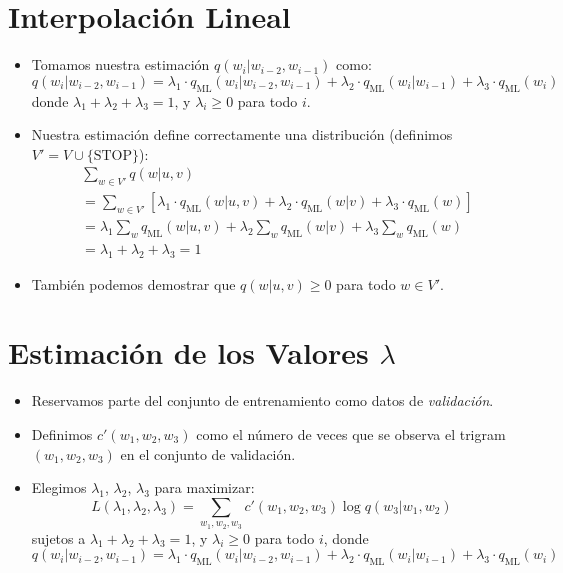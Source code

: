 \section{Interpolación Lineal}
\begin{itemize}
    \item Tomamos nuestra estimación $q(w_i | w_{i-2}, w_{i-1})$ como:
    \[
    q(w_i | w_{i-2}, w_{i-1}) = \lambda_1 \cdot q_{\text{ML}}(w_i | w_{i-2}, w_{i-1}) + \lambda_2 \cdot q_{\text{ML}}(w_i | w_{i-1}) + \lambda_3 \cdot q_{\text{ML}}(w_i)
    \]
    donde $\lambda_1 + \lambda_2 + \lambda_3 = 1$, y $\lambda_i \geq 0$ para todo $i$.    
    \item Nuestra estimación define correctamente una distribución (definimos $V' = V \cup \{\text{STOP}\}$):
    \[
    \begin{aligned}
        & \sum_{w \in V'} q(w | u, v) \\
        &= \sum_{w \in V'} [\lambda_1 \cdot q_{\text{ML}}(w | u, v) + \lambda_2 \cdot q_{\text{ML}}(w | v) + \lambda_3 \cdot q_{\text{ML}}(w)] \\
        &= \lambda_1 \sum_{w} q_{\text{ML}}(w | u, v) + \lambda_2 \sum_{w} q_{\text{ML}}(w | v) + \lambda_3 \sum_{w} q_{\text{ML}}(w) \\
        &= \lambda_1 + \lambda_2 + \lambda_3 = 1
    \end{aligned}
    \]
    \item También podemos demostrar que $q(w | u, v) \geq 0$ para todo $w \in V'$.
\end{itemize}

\section{Estimación de los Valores $\lambda$}
\begin{itemize}
    \item Reservamos parte del conjunto de entrenamiento como datos de \textit{validación}.
    \item Definimos $c'(w_1, w_2, w_3)$ como el número de veces que se observa el trigram $(w_1, w_2, w_3)$ en el conjunto de validación.
    \item Elegimos $\lambda_1$, $\lambda_2$, $\lambda_3$ para maximizar:
    \[
    L(\lambda_1, \lambda_2, \lambda_3) = \sum_{w_1,w_2,w_3} c'(w_1, w_2, w_3) \log q(w_3 | w_1, w_2)
    \]
    sujetos a $\lambda_1 + \lambda_2 + \lambda_3 = 1$, y $\lambda_i \geq 0$ para todo $i$, donde
    \[
    q(w_i | w_{i-2}, w_{i-1}) = \lambda_1 \cdot q_{\text{ML}}(w_i | w_{i-2}, w_{i-1}) + \lambda_2 \cdot q_{\text{ML}}(w_i | w_{i-1}) + \lambda_3 \cdot q_{\text{ML}}(w_i)
    \]
\end{itemize}

